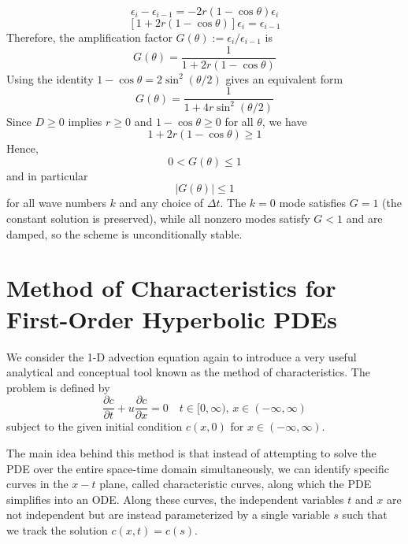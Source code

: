 \begin{equation}
    \epsilon_i - \epsilon_{i-1}
    =
    -2r \left(1-\cos\theta\right)\epsilon_i
\end{equation}
\begin{equation}
    \left[1 + 2r\left(1-\cos\theta\right)\right]\epsilon_i
    =
    \epsilon_{i-1}
\end{equation}
Therefore, the amplification factor $G(\theta) := \epsilon_i/\epsilon_{i-1}$ is
\begin{equation}
    G(\theta)
    =
    \frac{1}{1 + 2r\left(1-\cos\theta\right)}
\end{equation}
Using the identity $1-\cos\theta = 2\sin^2(\theta/2)$ gives an equivalent form
\begin{equation}
    G(\theta)
    =
    \frac{1}{1 + 4r\sin^2\left(\theta/2\right)}
\end{equation}
Since $D \ge 0$ implies $r \ge 0$ and $1-\cos\theta \ge 0$ for all $\theta$, we have
\begin{equation}
    1 + 2r\left(1-\cos\theta\right) \ge 1
\end{equation}
Hence,
\begin{equation}
    0 < G(\theta) \le 1
\end{equation}
and in particular
\begin{equation}
    \left|G(\theta)\right| \le 1
\end{equation}
for all wave numbers $k$ and any choice of $\Delta t$. The $k=0$ mode satisfies $G=1$ (the constant solution is preserved), while all nonzero modes satisfy $G<1$ and are damped, so the scheme is unconditionally stable.

\section{Method of Characteristics for First-Order Hyperbolic PDEs}

We consider the 1-D advection equation again to introduce a very useful analytical and conceptual tool known as the method of characteristics. The problem is defined by
\begin{equation}
    \frac{\partial c}{\partial t} + u \frac{\partial c}{\partial x} = 0 \quad t \in [0, \infty), \, x \in (-\infty, \infty)
\end{equation}
subject to the given initial condition $c(x,0)$ for $x \in (-\infty, \infty)$.

The main idea behind this method is that instead of attempting to solve the PDE over the entire space-time domain simultaneously, we can identify specific curves in the $x-t$ plane, called characteristic curves, along which the PDE simplifies into an ODE. Along these curves, the independent variables $t$ and $x$ are not independent but are instead parameterized by a single variable $s$ such that we track the solution $c(x,t) = c(s)$.

